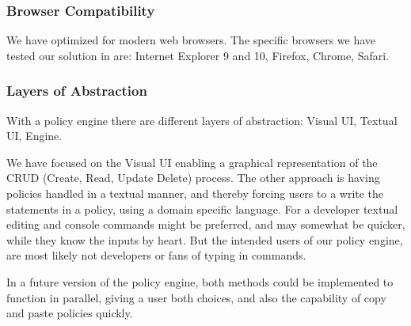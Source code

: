\subsubsection{Browser Compatibility}
We have optimized for modern web browsers. The specific browsers we have tested our solution in are: Internet Explorer 9 and 10, Firefox, Chrome, Safari. 

\subsubsection{Layers of Abstraction}
With a policy engine there are different layers of abstraction: Visual UI, Textual UI, Engine.

We have focused on the Visual UI enabling a graphical representation of the CRUD (Create, Read, Update Delete) process. The other approach is having policies handled in a textual manner, and thereby forcing users to a write the statements in a policy, using a domain specific language. For a developer textual editing and console commands might be preferred, and may somewhat be quicker, while they know the inputs by heart. But the intended users of our policy engine, are most likely not developers or fans of typing in commands.

In a future version of the policy engine, both methods could be implemented to function in parallel, giving a user both choices, and also the capability of copy and paste policies quickly.